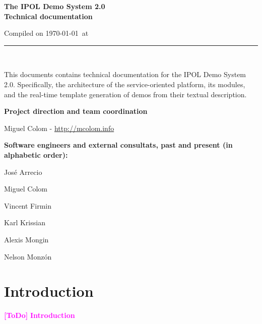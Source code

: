 \documentclass[a4paper,12pt]{article}
\newcommand{\ToDo}[1]{\textcolor{magenta}{\textbf{[ToDo]} \textbf{#1}}}
\begin{document}
\begin{titlepage}

\begin{center}
\vspace*{-1in}

\vspace*{0.6in}
\begin{Large}
\textbf{The IPOL Demo System 2.0 \\Technical documentation} \\
\end{Large}

\vspace*{0.6in}

\small{Compiled on \today\ at \currenttime}

\vspace*{0.6in}
\rule{80mm}{0.1mm}\\
\vspace*{0.1in}
\end{center}

\end{titlepage}

This documents contains technical documentation for the IPOL Demo System 2.0. Specifically, the architecture of the service-oriented platform, its modules, and the real-time template generation of demos from their textual description.
\vspace*{0.6in}

\textbf{Project direction and team coordination}

Miguel Colom - \url{http://mcolom.info}

\vspace*{0.2in}

\textbf{Software engineers and external consultats, past and present (in alphabetic order):}


José Arrecio

Miguel Colom

Vincent Firmin

Karl Krissian

Alexis Mongin

Nelson Monzón


\newpage

\tableofcontents
\newpage
\listoffigures
\newpage

\section{Introduction}
\ToDo{Introduction}
\end{document}
